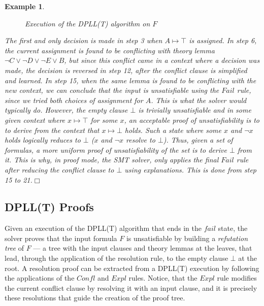 \documentclass[11pt]{article}
\newtheorem{example}{Example}[section]
\begin{document}
\begin{example}
\begin{figure}[t]
			\caption{Execution of the DPLL(T) algorithm on $F$}
			\label{fig:dplltex}
		\end{figure}
		The first and only decision is made in 
		step 3 when $A \mapsto \top$ is assigned.
		In step 6, the current assignment is 
		found to be conflicting with theory
		lemma $\neg C \lor \neg D \lor \neg E
		\lor B$, but since this conflict 
		came in a context where a decision
		was made, the decision is reversed
		in step 12, after the conflict clause 
		is simplified and learned. In step 15, 
		when the same lemma is found to be 
		conflicting with the new context, we 
		can conclude that the input is 
		unsatisfiable using the $\mathit{Fail}$ rule, 
		since we tried both choices of 
		assignment for $A$. This is what 
		the solver would typically do. However, 
		the empty clause $\bot$ 
		is trivially unsatisfiable and in 
		some given context where 
		$x \mapsto \top$ for some $x$, an 
		acceptable proof of unsatisfiability 
		is to to derive from the context that 
		$x \mapsto \bot$ holds. Such a state 
		where some $x$ and $\neg x$ holds
		logically reduces to $\bot$ 
		($x$ and $\neg x$ resolve to $\bot$).
		Thus, given a set of formulas,
		a more uniform proof of 
		unsatisfiability of the set is 
		to derive $\bot$ from it. This is why, 
		in proof mode, the SMT solver, only 
		applies the final $\mathit{Fail}$ rule after 
		reducing the conflict clause to $\bot$
		using explanations. This is done 
		from step 15 to 21.\hfill$\Box$
	\end{example}
	
	\subsection{DPLL(T) Proofs}
	\label{sec:proofex}
	Given an execution of the DPLL(T)
	algorithm that ends in the $fail$ state, 
	the solver proves that the input formula 
	$F$ is unsatisfiable by building a 
	\textit{refutation tree} of $F$ --- a 
	tree with the input clauses 
	and theory lemmas at the leaves, 
	that lead, through the application of 
	the resolution rule, to the empty 
	clause $\bot$ at the root. A
	resolution proof can be extracted 
	from a DPLL(T) execution
	by following the applications of 
	the $\mathit{Confl}$ and 
	$\mathit{Expl}$ rules. Notice, that
	the $\mathit{Expl}$ rule 
	modifies the current conflict clause by 
	resolving it with an input clause, and 
	it is precisely these resolutions 
	that guide the creation of the proof tree.
	
\end{document}
